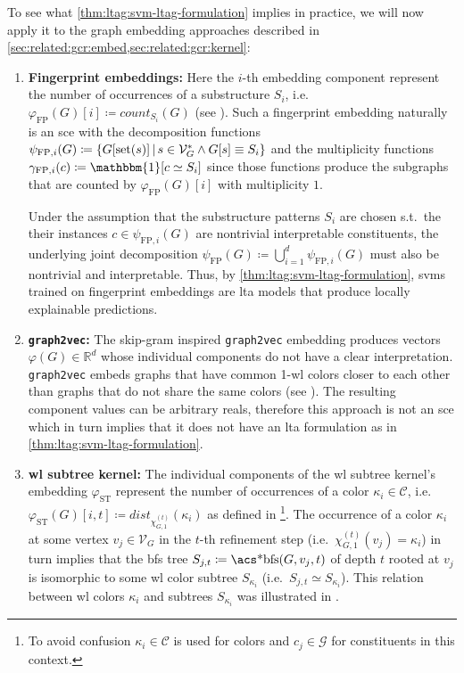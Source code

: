 To see what \cref{thm:ltag:svm-ltag-formulation} implies in practice, we will now apply it to the graph embedding approaches described in \cref{sec:related:gcr:embed,sec:related:gcr:kernel}:
\begin{enumerate}[label=\textbf{\arabic*.}]
	\item \textbf{Fingerprint embeddings:}
		Here the $i$-th embedding component represent the number of occurrences of a substructure $S_i$, i.e.\ ${\varphi}_{\text{FP}}(G)[i] \coloneqq \mathit{count}_{S_i}(G)$ (see ).
		Such a fingerprint embedding naturally is an \ac{sce} with the decomposition functions $\psi_{\text{FP}, i}(G) \coloneqq \{ G[\operatorname{set}(s)]\, |\, s \in \mathcal{V}_G^{*} \land G[s] \equiv S_i \}$ and the multiplicity functions $\gamma_{\text{FP}, i}(c) \coloneqq \mathbbm{1}[c \simeq S_i]$ since those functions produce the subgraphs that are counted by ${\varphi}_{\text{FP}}(G)[i]$ with multiplicity $1$. %

		Under the assumption that the substructure patterns $S_i$ are chosen s.t.\ the their instances $c \in \psi_{\text{FP}, i}(G)$ are nontrivial interpretable constituents, the underlying joint decomposition $\psi_{\text{FP}}(G) \coloneqq \bigcup_{i=1}^d \psi_{\text{FP}, i}(G)$ must also be nontrivial and interpretable.
		Thus, by \cref{thm:ltag:svm-ltag-formulation}, \acp{svm} trained on fingerprint embeddings are \ac{lta} models that produce locally explainable predictions.
	\item \textbf{\texttt{graph2vec}:}
		The skip-gram inspired \texttt{graph2vec} embedding produces vectors $\varphi(G) \in \mathbb{R}^d$ whose individual components do not have a clear interpretation.
		\texttt{graph2vec} embeds graphs that have common 1-\acs{wl} colors closer to each other than graphs that do not share the same colors (see ).
		The resulting component values can be arbitrary reals, therefore this approach is not an \ac{sce} which in turn implies that it does not have an \ac{lta} formulation as in \cref{thm:ltag:svm-ltag-formulation}.
	\item \textbf{\ac{wl} subtree kernel:}
		The individual components of the \ac{wl} subtree kernel's embedding $\varphi_{\text{ST}}$ represent the number of occurrences of a color $\kappa_i \in \mathcal{C}$, i.e.\ $\varphi_{\text{ST}}(G)[i, t] \coloneqq \mathit{dist}_{\chi_{G,1}^{(t)}}(\kappa_i)$ as defined in \footnote{
			To avoid confusion $\kappa_i \in \mathcal{C}$ is used for colors and $c_j \in \mathcal{G}$ for constituents in this context.
		}.
		The occurrence of a color $\kappa_i$ at some vertex $v_j \in \mathcal{V}_G$ in the $t$-th refinement step (i.e.\ $\chi_{G,1}^{(t)}(v_j) = \kappa_i$) in turn implies that the \ac{bfs} tree $S_{j,t} \coloneqq \text{\acs*{bfs}}(G, v_j, t)$ of depth $t$ rooted at $v_j$ is isomorphic to some \ac{wl} color subtree $S_{\kappa_i}$ (i.e.\ $S_{j,t} \simeq S_{\kappa_i}$).
		This relation between \ac{wl} colors $\kappa_i$ and subtrees $S_{\kappa_i}$ was illustrated in .


\end{enumerate}
